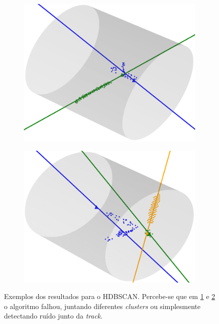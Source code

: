 \documentclass[a4paper,12pt,oneside]{book}
\begin{document}
\begin{figure}[H]
\begin{subfigure}[b]{0.48\textwidth}
        \includegraphics[scale=0.4]{figs/cl_ex3.png}
        \caption{}
        \label{subfig:cl_ex3}
    \end{subfigure}%
    \hfill
    \begin{subfigure}[b]{0.48\textwidth}
        \centering
        \includegraphics[scale=0.4]{figs/cl_ex4.png}
        \caption{}
        \label{subfig:cl_ex4}
    \end{subfigure}
\caption{Exemplos dos resultados para o HDBSCAN. Percebe-se que em \ref{subfig:cl_ex3} e \ref{subfig:cl_ex4} o algoritmo falhou, juntando diferentes \textit{clusters} ou simplesmente detectando ruído junto da \textit{track}.}
\label{fig:cl_exs}
\end{figure}
\end{document}
